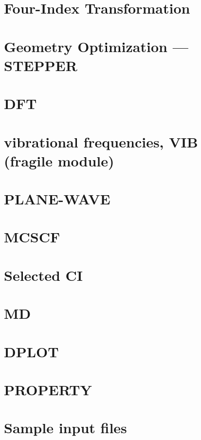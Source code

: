 \section{Four-Index Transformation} 


\section{Geometry Optimization --- STEPPER}


\section{DFT}


\section{vibrational frequencies, VIB (fragile module)}


\section{PLANE-WAVE}


\section{MCSCF}


\section{Selected CI}


\section{MD}


\section{DPLOT}


\section{PROPERTY}


\section{Sample input files}


